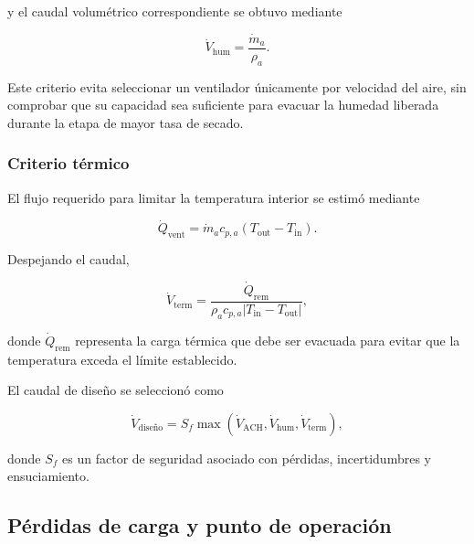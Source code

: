 y el caudal volumétrico correspondiente se obtuvo mediante

\begin{equation}
\dot V_{\mathrm{hum}}
=
\frac{\dot m_a}{\rho_a}.
\label{eq:caudal_humedad}
\end{equation}

Este criterio evita seleccionar un ventilador únicamente por velocidad del aire, sin comprobar que su capacidad sea suficiente para evacuar la humedad liberada durante la etapa de mayor tasa de secado.

\subsubsection{Criterio térmico}

El flujo requerido para limitar la temperatura interior se estimó mediante

\begin{equation}
\dot Q_{\mathrm{vent}}
=
\dot m_a c_{p,a}
\left(
T_{\mathrm{out}}
-
T_{\mathrm{in}}
\right).
\label{eq:carga_ventilacion}
\end{equation}

Despejando el caudal,

\begin{equation}
\dot V_{\mathrm{term}}
=
\frac{
\dot Q_{\mathrm{rem}}
}{
\rho_a c_{p,a}
\left|
T_{\mathrm{in}}-T_{\mathrm{out}}
\right|
},
\label{eq:caudal_termico}
\end{equation}

donde $\dot Q_{\mathrm{rem}}$ representa la carga térmica que debe ser evacuada para evitar que la temperatura exceda el límite establecido.

El caudal de diseño se seleccionó como

\begin{equation}
\dot V_{\mathrm{diseño}}
=
S_f
\max
\left(
\dot V_{\mathrm{ACH}},
\dot V_{\mathrm{hum}},
\dot V_{\mathrm{term}}
\right),
\label{eq:caudal_diseno_actuador}
\end{equation}

donde $S_f$ es un factor de seguridad asociado con pérdidas, incertidumbres y ensuciamiento.

\subsection{Pérdidas de carga y punto de operación}
\label{subsec:perdidas_carga_actuadores}

